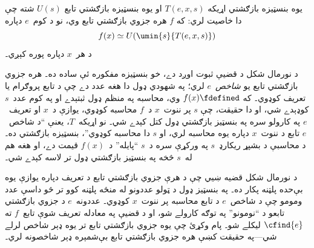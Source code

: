 \documentclass[../../../include/open-logic-section]{subfiles}
\begin{document}

\begin{thm}
يوه بنسټيزه بازګشتي اړيکه $T(e, x, s)$ او يوه بنسټيزه بازګشتي تابع
$U(s)$ شته چې دا خاصيت لري: که $f$ هره جزوي بازګشتي تابع وي، نو د
کوم~$e$ دپاره
\[
f(x) \simeq U(\umin{s}{T(e, x, s)})
\]
د هر~$x$ دپاره پوره کېږي۔
\end{thm}

\begin{explain}
د نورمال شکل د قضيې ثبوت اوږد دے، خو بنسټيزه مفکوره ئې ساده ده۔ هره
جزوي بازګشتي تابع يو \emph{شاخص}~$e$ لري؛ په شهودي ډول دا هغه عدد دے
چې د تابع پروګرام يا تعريف کوډوي۔ که $f(x) \fdefined$ وي، محاسبه په
منظم ډول ثبتېدے او په کوم عدد~$s$ کوډېدے شي، او دا حقيقت، چې $s$ پر
ننوت~$x$ د~$f$ محاسبه کوډوي، يوازې د~$x$ او تعريف~$e$ په کارولو سره
په بنسټيز بازګشتي ډول کتل کېدے شي۔ نو اړيکه~$T$، يعنې ``د شاخص~$e$
تابع د ننوت~$x$ دپاره يوه محاسبه لري، او $s$ دا محاسبه کوډوي''،
بنسټيزه بازګشتي ده۔ د محاسبې د بشپړ ريکارډ~$s$ په ورکړې سره د~$s$
``پايله'' د~$f(x)$ قيمت دے، او هغه هم له~$s$ څخه په بنسټيز بازګشتي
ډول تر لاسه کېدے شي۔

د نورمال شکل قضيه ښيي چې د هرې جزوي بازګشتي تابع د تعريف دپاره يوازې
يوه بې‌حده پلټنه پکار ده۔ په بنسټيز ډول د ټولو عددونو له منځه پلټنه
کوو تر څو داسې عدد ومومو چې د شاخص~$e$ د تابع محاسبه پر ننوت~$x$
کوډوي۔ عددونه~$e$ د جزوي بازګشتي تابعو د ``نومونو'' په توګه کارولے
شو، او د قضيې په معادله تعريف شوې تابع~$f$ ته $\cfind{e}$ ليکلے شو۔
پام وکړئ چې يوه جزوي بازګشتي تابع تر يوه ډېر شاخص لرلے شي---په حقيقت
کښې هره جزوي بازګشتي تابع بې‌شمېره ډېر شاخصونه لري۔
\end{explain}
\end{document}
